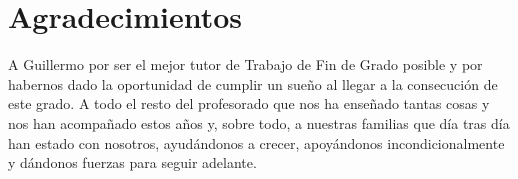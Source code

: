 
\chapter*{Agradecimientos}

A Guillermo por ser el mejor tutor de Trabajo de Fin de Grado posible y por habernos dado la oportunidad de cumplir un sueño al llegar a la consecución de este grado.
A todo el resto del profesorado que nos ha enseñado tantas cosas y nos han acompañado estos años y, sobre todo, a nuestras familias que día tras día han estado con nosotros, ayudándonos a crecer, apoyándonos incondicionalmente y dándonos fuerzas para seguir adelante.










